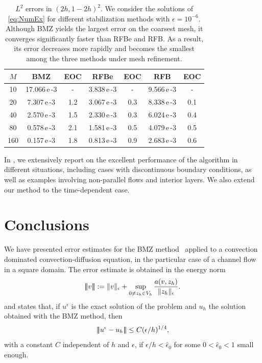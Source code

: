 \documentclass{article}
\newcommand{\vvvert}{\ensuremath|\!|\!|\xspace}
\newcommand{\ueps}{u^\epsilon}
\begin{document}
\begin{table}[ht]
\centering
\begin{tabular}{|c|c|c|c|c|c|c|}
\hline
$M$ & BMZ & EOC & RFBe & EOC & RFB & EOC \\
\hline
10  & 17.066\,e\,-3 &   -    & 3.838\,e\,-3&  -   & 9.566\,e\,-3 &  -  \\
20  &  7.307\,e\,-3 &  1.2   & 3.067\,e\,-3& 0.3  & 8.338\,e\,-3 & 0.1 \\
40  &  2.570\,e\,-3 &  1.5   & 2.330\,e\,-3& 0.3  & 6.024\,e\,-3 & 0.4 \\
80  &  0.578\,e\,-3 &  2.1   & 1.581\,e\,-3& 0.5  & 4.079\,e\,-3 & 0.5 \\
160 &  0.157\,e\,-3 &  1.8   & 0.813\,e\,-3& 0.9  & 2.683\,e\,-3 & 0.6 \\
\hline
\end{tabular}
\caption{\small \label{table: EOC L2 (2h,1-2h)}$L^2$ errors in $(2h,1-2h)^2$. We consider the solutions of \eqref{eq:NumEx} for different stabilization methods with ${\epsilon=10^{-6}}$. Although BMZ yields the largest error on the coarsest mesh, it converges significantly faster than RFBe and RFB. As a result, its error decreases more rapidly and becomes the smallest among the three methods under mesh refinement.}
\end{table}

In \cite{BMZ}, we extensively report on the excellent performance of the algorithm in different situations,
including cases with discontinuous boundary conditions, as well as examples involving non-parallel flows and interior layers.
We also extend our method to the time-dependent case.

\section{Conclusions}
\label{Sec:conclusions}

We have presented error estimates for the BMZ method~\cite{BMZ} applied to a convection dominated convection-diffusion equation, in the particular case of a channel flow in a square domain.
The error estimate is obtained in the energy norm
\[
\vvvert  v\vvvert   := \|v\|_\epsilon + 
\sup_{0\not= z_h\in V_h} \frac{a(v,z_h)}{\|z_h\|_\epsilon}.
\]
and states that, if $\ueps$ is the exact solution of the problem and $u_h$ the solution obtained with the BMZ method, then
$$ 
\vvvert \ueps - u_h\vvvert \le C (\epsilon/h)^{1/4},
$$ 
with a constant $C$ independent of $h$ and $\epsilon$, if $\epsilon/h < \hat{\epsilon}_0$ for some $0<\hat{\epsilon}_0<1$ small enough.
\end{document}

